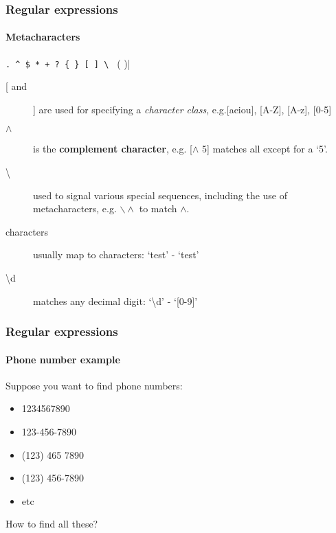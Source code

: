 \begin{frame}[fragile]\frametitle{Regular expressions}
    \framesubtitle{Metacharacters}

    \verb|. ^ $ * + ? { } [ ] \ | ( )|

    \begin{description}
        \item[[ and ]] are used for specifying a \emph{character class},
        e.g.[aeiou], [A-Z], [A-z], [0-5]
        \item[$\wedge$] is the \textbf{complement character}, e.g. [$\wedge$ 5] matches all
        except for a `5'.
        \item[\textbackslash] used to signal various special sequences, including
        the use of metacharacters, e.g. $\backslash\wedge$ to match $\wedge$.
        \item[characters] usually map to characters: `test' - `test'
        \item[\textbackslash d] matches any decimal digit:
                `\textbackslash d' - `[0-9]'
    \end{description}


\end{frame}

\begin{frame}[fragile]\frametitle{Regular expressions}
    \framesubtitle{Phone number example}

    Suppose you want to find phone numbers:

    \begin{itemize}
        \item 1234567890
        \item 123-456-7890
        \item (123) 465 7890
        \item (123) 456-7890
        \item etc
    \end{itemize}

    How to find all these?

    \vfill



\end{frame}


